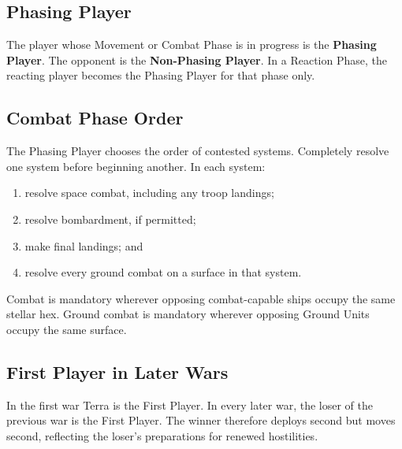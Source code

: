 \subsection{Phasing Player}

The player whose Movement or Combat Phase is in progress is the \textbf{Phasing
Player}. The opponent is the \textbf{Non-Phasing Player}. In a Reaction Phase,
the reacting player becomes the Phasing Player for that phase only.

\subsection{Combat Phase Order}

The Phasing Player chooses the order of contested systems. Completely resolve
one system before beginning another. In each system:

\begin{enumerate}
  \item resolve space combat, including any troop landings;
  \item resolve bombardment, if permitted;
  \item make final landings; and
  \item resolve every ground combat on a surface in that system.
\end{enumerate}

Combat is mandatory wherever opposing combat-capable ships occupy the same
stellar hex. Ground combat is mandatory wherever opposing Ground Units occupy
the same surface.

\subsection{First Player in Later Wars}

In the first war Terra is the First Player. In every later war, the loser of
the previous war is the First Player. The winner therefore deploys second but
moves second, reflecting the loser's preparations for renewed hostilities.
